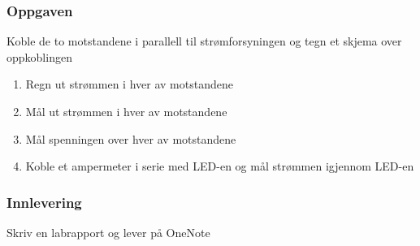 \subsubsection*{Oppgaven}
Koble de to motstandene i parallell til strømforsyningen og tegn et skjema over oppkoblingen
\begin{enumerate}
		
		\item Regn ut strømmen i hver av motstandene
		\item Mål ut strømmen i hver av motstandene
		\item Mål spenningen over hver av motstandene
		\item Koble et ampermeter i serie med LED-en og mål strømmen igjennom LED-en
\end{enumerate}

\subsubsection*{Innlevering}

Skriv en labrapport og lever på OneNote\\
\vskip 5pt 



